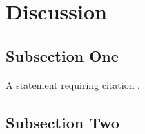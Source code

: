 \documentclass[twoside,twocolumn]{article}
\begin{document}
\section{Discussion}

\subsection{Subsection One}

A statement requiring citation \cite{Figueredo:2009dg}.
\blindtext %

\subsection{Subsection Two}

\blindtext %





\end{document}
